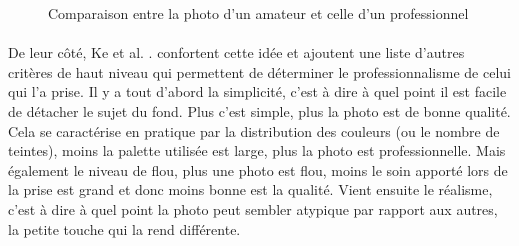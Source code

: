 \documentclass[11pt, french,screen]{report-rd-info}
\begin{document}
\begin{figure}[htp]
 \caption{Comparaison entre la photo d'un amateur et celle d'un professionnel\cite{Ke}}
 \label{fig:ComparaisonPhotosAmateurPro}
\end{figure}
\paragraph*{}
\label{crit:both}
De leur côté, Ke et al. . \cite{Ke}  confortent cette idée et ajoutent une liste d’autres critères de haut niveau qui permettent de déterminer le professionnalisme de celui qui l’a prise. Il y a tout d’abord la simplicité, c'est à dire à quel point il est facile de détacher le sujet du fond. Plus c'est simple, plus la photo est de bonne qualité. Cela se caractérise en pratique par la distribution des couleurs (ou le nombre de teintes), moins la palette utilisée est large, plus la photo est professionnelle. Mais également le niveau de flou, plus une photo est flou, moins le soin apporté lors de la prise est grand et donc moins bonne est la qualité.
Vient ensuite le réalisme, c'est à dire à quel point la photo peut sembler atypique par rapport aux autres, la petite touche qui la rend différente.
\end{document}
